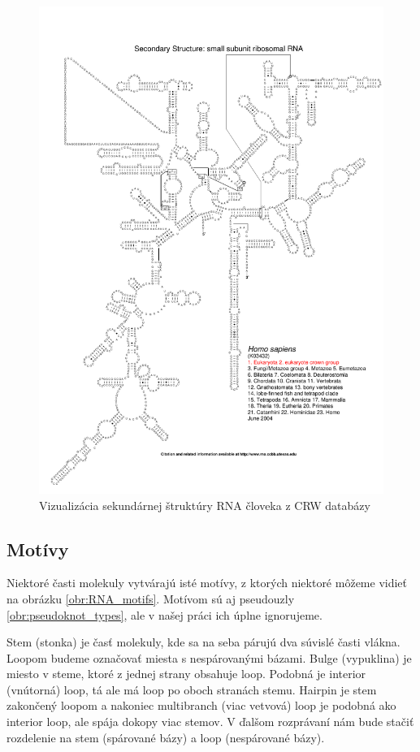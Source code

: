 \begin{figure}
  \includegraphics[width=1\textwidth]{../img/human_crw}
  \caption{Vizualizácia sekundárnej štruktúry RNA človeka z CRW databázy }
  \label{obr:human_crw}
\end{figure}

\subsection{Motívy}

Niektoré časti molekuly vytvárajú isté motívy, z ktorých niektoré môžeme
vidieť na obrázku \ref{obr:RNA_motifs}.
Motívom sú aj pseudouzly \ref{obr:pseudoknot_types}, ale v našej práci
ich úplne ignorujeme.

Stem (stonka) je časť molekuly, kde sa na seba párujú dva súvislé časti vlákna.
Loopom budeme označovať miesta s nespárovanými bázami.
Bulge (vypuklina) je miesto v steme, ktoré z jednej strany obsahuje loop.
Podobná je interior (vnútorná) loop, tá ale má loop po oboch stranách stemu.
Hairpin je stem zakončený loopom a nakoniec multibranch (viac vetvová) loop
je podobná ako interior loop, ale spája dokopy viac stemov.
V ďalšom rozprávaní nám bude stačiť rozdelenie na stem (spárované bázy)
a loop (nespárované bázy).

